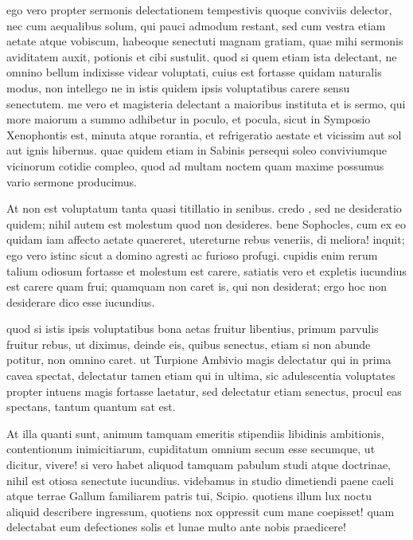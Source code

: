  ego vero propter sermonis delectationem tempestivis quoque conviviis delector, nec cum aequalibus solum, qui pauci admodum restant, sed cum vestra etiam aetate atque vobiscum, habeoque senectuti magnam gratiam, quae mihi sermonis aviditatem auxit, potionis et cibi sustulit. quod si quem etiam ista delectant, ne omnino bellum indixisse videar voluptati, cuius est fortasse quidam naturalis modus, non intellego ne in istis quidem ipsis voluptatibus carere sensu senectutem. me vero et magisteria delectant a maioribus instituta et is sermo, qui more maiorum a summo adhibetur in poculo, et pocula, sicut in Symposio Xenophontis est, minuta atque rorantia, et refrigeratio aestate et vicissim aut sol aut ignis hibernus. quae quidem etiam in Sabinis persequi soleo conviviumque vicinorum cotidie compleo, quod ad multam noctem quam maxime possumus vario sermone producimus.

 At non est voluptatum tanta quasi titillatio in senibus. credo , sed ne desideratio quidem; nihil autem est molestum quod non desideres. bene Sophocles, cum ex eo quidam iam affecto aetate quaereret, utereturne rebus veneriis, di meliora! inquit; ego vero istinc sicut a domino agresti ac furioso profugi. cupidis enim rerum talium odiosum fortasse et molestum est carere, satiatis vero et expletis iucundius est carere quam frui; quamquam non caret is, qui non desiderat; ergo hoc non desiderare dico esse iucundius.

 quod si istis ipsis voluptatibus bona aetas fruitur libentius, primum parvulis fruitur rebus, ut diximus, deinde eis, quibus senectus, etiam si non abunde potitur, non omnino caret. ut Turpione Ambivio magis delectatur qui in prima cavea spectat, delectatur tamen etiam qui in ultima, sic adulescentia voluptates propter intuens magis fortasse laetatur, sed delectatur etiam senectus, procul eas spectans, tantum quantum sat est.

 At illa quanti sunt, animum tamquam emeritis stipendiis libidinis ambitionis, contentionum inimicitiarum, cupiditatum omnium secum esse secumque, ut dicitur, vivere! si vero habet aliquod tamquam pabulum studi atque doctrinae, nihil est otiosa senectute iucundius. videbamus in studio dimetiendi paene caeli atque terrae Gallum familiarem patris tui, Scipio. quotiens illum lux noctu aliquid describere ingressum, quotiens nox oppressit cum mane coepisset! quam delectabat eum defectiones solis et lunae multo ante nobis praedicere!

